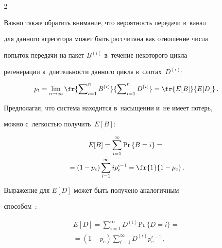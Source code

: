 \begin{multicols}{2}
\begin{equation}
    \end{equation}




    Важно также обратить внимание, что вероятность передачи в~канал 


для данного агрегатора может быть рассчитана как отношение числа 


попыток передачи на пакет $B^{(i)}$ в~течение некоторого цикла 


регенерации к~длительности данного цикла в~слотах~$D^{(i)}$:


    \begin{equation}


    p_t=\lim\limits_{n\to\infty} \fr{\sum\nolimits_{i=1}^n 


B^{(i)}}{\sum\nolimits_{i=1}^n D^{(i)}}=\fr{E[B]}{E[D]}\,.


    \label{e2-om}


    \end{equation}


    


    Предполагая, что система находится в~насыщении и~не имеет потерь, 


можно с~легкостью получить~$E[B]$:


    \begin{multline}


    E[B]= \sum\limits_{i=1}^\infty \mathrm{Pr}\,\{B=i\} ={}\\


    {}=\left(1-p_c\right) 


\sum\limits_{i=1}^\infty ip_c^{i-1} =\fr{1}{1-p_c}\,.


    \label{e3-om}


    \end{multline}


    


    Выражение для $E[D]$ может быть получено аналогичным 


способом~\cite{10-om}:


    \begin{multline}


    E[D]= \sum\limits_{i=1}^\infty  D^{(i)} \mathrm{Pr}\,\{D=i\}={}\\


    {}=\left(1-p_c\right) 


\sum\limits_{i=1}^\infty D^{(i)} p_c^{i-1}\,,


    \label{e4-om}



\end{multline}
\end{multicols}
